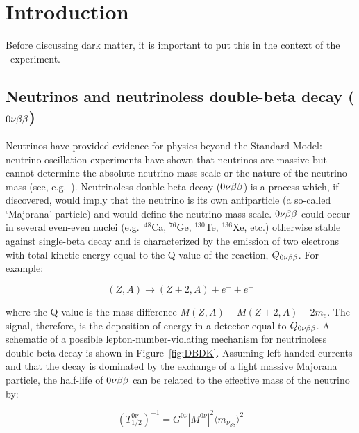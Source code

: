 
\chapter{Introduction}
	\label{chap:IntroChapter}

	Before discussing dark matter, it is important to put this in the context of the \MJ~experiment.  

	\section{Neutrinos and neutrinoless double-beta decay ($0 \nu \beta \beta$)}
	
	Neutrinos have provided evidence for physics beyond the Standard Model: 
neutrino oscillation experiments have shown that neutrinos are massive but
cannot determine the absolute neutrino mass scale or the nature of the neutrino
mass (see, e.g.~\cite{Mes04}).  Neutrinoless double-beta decay ($0 \nu \beta \beta$) is a
process which, if discovered, would imply that the neutrino is its own
antiparticle (a so-called `Majorana' particle) and would define the neutrino
mass scale.  $0 \nu \beta \beta$ could occur in several even-even nuclei (e.g.~$^{48}$Ca,
$^{76}$Ge, $^{130}$Te, $^{136}$Xe, etc.) otherwise stable against
single-beta decay and is characterized by the emission of two electrons with
total kinetic energy equal to the Q-value of the reaction, $Q_{0 \nu \beta \beta}$.  For example:

		\begin{equation}
		(Z,A) \rightarrow (Z+2,A) + e^- + e^-
		\end{equation} 

where the Q-value is the mass difference $M(Z,A)-M(Z+2,A)-2m_e$.  The signal, therefore, 
is the deposition of energy in a detector equal to $Q_{0 \nu \beta \beta}$.
A schematic of a possible lepton-number-violating mechanism for neutrinoless double-beta
decay is shown in Figure~\ref{fig:DBDK}.  Assuming left-handed currents and
that the decay is dominated by the exchange of a light massive Majorana
particle, the half-life of $0 \nu \beta \beta$ can be related to the effective mass of
the neutrino by:

		\begin{equation}
		\left( T_{1/2}^{0\nu}\right)^{-1} = G^{0\nu} |M^{0\nu}|^2 \langle m_{\nu_{\beta\beta}} \rangle^2  
		\end{equation} 

